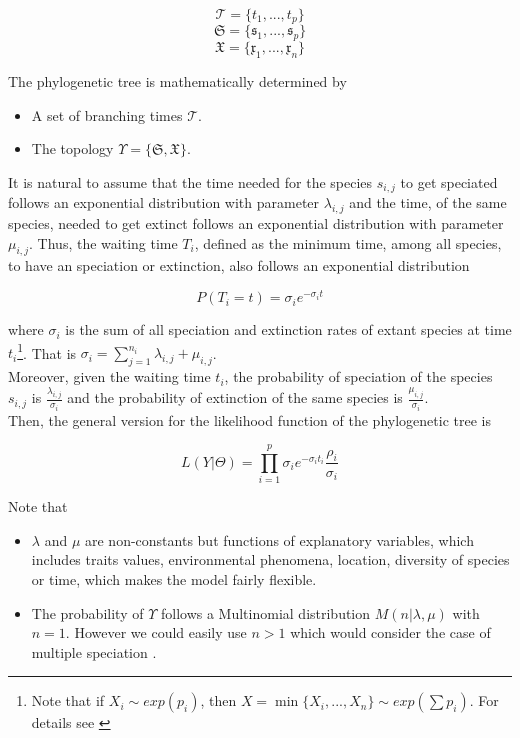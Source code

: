 $$\mathcal{T} = \{t_1,...,t_p\}$$
$$\mathfrak{S} = \{\mathfrak{s}_1,...,\mathfrak{s}_p\}$$
$$\mathfrak{X} = \{ \mathfrak{x}_1, ..., \mathfrak{x}_n \} $$

The phylogenetic tree is mathematically determined by

\begin{itemize}
	\item A set of branching times $\mathcal{T}$.
	\item The topology  $\Upsilon = \{ \mathfrak{S}, \mathfrak{X} \}$.   
\end{itemize}


It is natural to assume \cite{Phyl} that the time needed for the species $s_{i,j}$ to get speciated follows an exponential distribution with parameter $\lambda_{i,j}$ and the time, of the same species, needed to get extinct follows an exponential distribution with parameter $\mu_{i,j}$. Thus, the waiting time $T_i$, defined as the minimum time, among all species, to have an speciation or extinction, also follows an exponential distribution  

	$$ P(T_i = t) = \sigma_i e^{-\sigma_i t} $$ 
	
where $\sigma_i$ is the sum of all speciation and extinction rates of extant species at time $t_i$\footnote{Note that if $X_i \sim exp(p_i)$, then $X = \min\{X_i,...,X_n\}\sim exp(\sum p_i)$. For details see \cite{casella}}. That is $\sigma_i = \sum_{j=1}^{n_i} \lambda_{i,j} +\mu_{i,j} $. \\

Moreover, given the waiting time $t_i$, the probability of speciation of the species $s_{i,j}$ is $\frac{\lambda_{i,j}}{\sigma_i}$ and the probability of extinction of the same species is $\frac{\mu_{i,j}}{\sigma_i}$.\\

		
 Then, the general version for the likelihood function of the phylogenetic tree is
 
 		\begin{equation} L( Y | \Theta) = \displaystyle\prod_{i=1}^p \sigma_i e^{-\sigma_i t_i} \frac{\rho_{i}}{\sigma_i}  
 		\label{llik}
 		\end{equation}
 		
Note that
 
\begin{itemize}
 	
 	\item $\lambda$ and $\mu$ are non-constants but functions of explanatory variables, which includes traits values, environmental phenomena, location, diversity of species or time, which makes the model fairly flexible. 
 	\item The probability of $\Upsilon$ follows a Multinomial distribution $M(n | \lambda,\mu)$ with $n=1$. However we could easily use $n > 1$ which would consider the case of multiple speciation \cite{multi}.
 	 \end{itemize}
 	 

